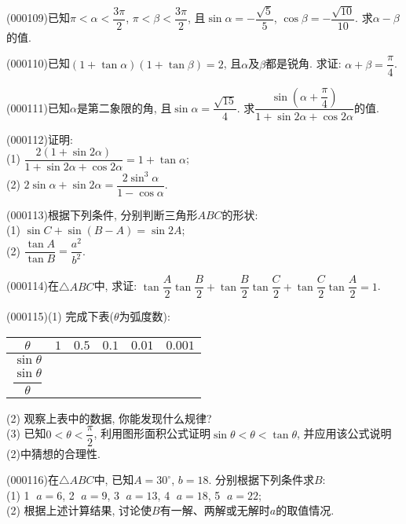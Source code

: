 \item (000109)已知$\pi <\alpha<\dfrac{3\pi} 2$, $\pi <\beta<\dfrac{3\pi} 2$, 且$\sin \alpha=-\dfrac{\sqrt 5}5$, $\cos \beta=-\dfrac{\sqrt{10}}{10}$. 求$\alpha-\beta$的值.
\item (000110)已知$(1+\tan \alpha)(1+\tan \beta)=2$, 且$\alpha$及$\beta$都是锐角. 求证: $\alpha+\beta=\dfrac{\pi}{4}$.
\item (000111)已知$\alpha$是第二象限的角, 且$\sin \alpha=\dfrac{\sqrt {15}}4$. 求$\dfrac{\sin (\alpha+\dfrac{\pi}{4})}{1+\sin 2\alpha+\cos 2\alpha}$的值.
\item (000112)证明:\\
(1) $\dfrac{2(1+\sin 2\alpha)}{1+\sin 2\alpha+\cos 2\alpha}=1+\tan \alpha$;\\
(2) $2\sin \alpha+\sin 2\alpha=\dfrac{2\sin^3\alpha}{1-\cos \alpha}$.
\item (000113)根据下列条件, 分别判断三角形$ABC$的形状:\\
(1) $\sin C+\sin (B-A)=\sin 2A$;\\
(2) $\dfrac{\tan A}{\tan B}=\dfrac{a^2}{b^2}$.
\item (000114)在$\triangle ABC$中, 求证: $\tan \dfrac A2\tan \dfrac B2+\tan \dfrac B2\tan\dfrac C2+\tan\dfrac C2\tan\dfrac A2=1$.
\item (000115)(1) 完成下表($\theta$为弧度数):
\begin{center}
\begin{tabular}{|c|p{}<{\centering}|p{}<{\centering}|p{}<{\centering}|p{}<{\centering}|p{}<{\centering}|}
    \hline
    $\theta$ & $1$ & $0.5$ & $0.1$ & $0.01$ & $0.001$\\ \hline
    $\sin\theta$ & & & & &\\ \hline
    $\dfrac{\sin\theta}{\theta}$ & & & & &\\ \hline
\end{tabular}
\end{center}
(2) 观察上表中的数据, 你能发现什么规律?\\
(3) 已知$0<\theta <\dfrac \pi 2$, 利用图形面积公式证明$\sin \theta <\theta <\tan \theta$, 并应用该公式说明(2)中猜想的合理性.
\item (000116)在$\triangle ABC$中, 已知$A=30^\circ$, $b=18$. 分别根据下列条件求$B$:\\
(1) \textcircled{1} $a=6$, \textcircled{2} $a=9$, \textcircled{3} $a=13$, \textcircled{4} $a=18$, \textcircled{5} $a=22$;\\
(2) 根据上述计算结果, 讨论使$B$有一解、两解或无解时$a$的取值情况.

